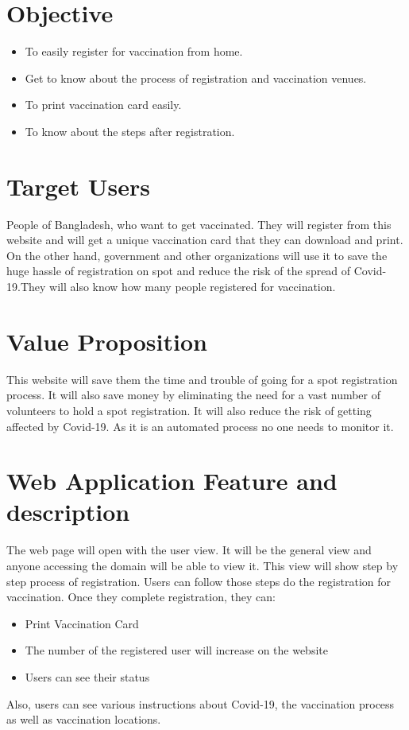 \documentclass[15pt]{article}
\begin{document}
\section*{Objective}
\begin{itemize}
  \item To easily register for vaccination from home.
  \item Get to know about the process of registration and vaccination venues. 
  \item To print vaccination card easily.
  \item To know about the steps after registration.
  
\end{itemize}

\section*{Target Users}
People of Bangladesh, who want to get vaccinated. They will register from this website and will get a unique vaccination card that they can download and print. \\
 On the other hand, government and other organizations will use it to save the huge hassle of registration on spot and reduce the risk of the spread of Covid-19.They will also know how many people registered for vaccination.   

\section*{Value Proposition}
This website will save them the time and trouble of going for a spot registration process. It will also save money by eliminating the need for a vast number of volunteers to hold a spot registration. It will also reduce the risk of getting affected by Covid-19. As it is an automated process no one needs to monitor it.

\newpage

\section*{Web Application Feature and description}
The web page will open with the user view. It will be the general view and anyone accessing the domain will be able to view it. This view will show step by step process of registration. Users can follow those steps do the registration for vaccination. Once they complete registration, they can:

\begin{itemize}
   \item Print Vaccination Card
   \item  The number of the registered user will increase on the website
   \item Users can see their status
\end{itemize}
Also, users can see various instructions about Covid-19, the vaccination process as well as vaccination locations. 
\end{document}
